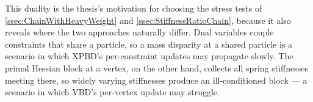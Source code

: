 This duality is the thesis's motivation for choosing the stress tests of
\autoref{ssec:ChainWithHeavyWeight} and \autoref{ssec:StiffnessRatioChain},
because it also reveals where the two approaches naturally differ. Dual variables
couple constraints that share a particle, so a mass disparity at a shared particle
is a scenario in which XPBD's per-constraint updates may propagate slowly. The
primal Hessian block at a vertex, on the other hand, collects all spring
stiffnesses meeting there, so widely varying stiffnesses produce an
ill-conditioned block --- a scenario in which VBD's per-vertex update may struggle.
